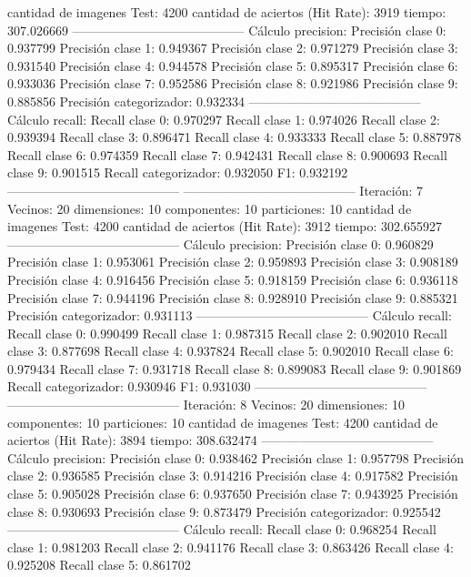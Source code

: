cantidad de imagenes Test: 4200
cantidad de aciertos (Hit Rate): 3919
tiempo: 307.026669
-----------------------------------------
Cálculo precision: 
Precisión clase 0: 0.937799
Precisión clase 1: 0.949367
Precisión clase 2: 0.971279
Precisión clase 3: 0.931540
Precisión clase 4: 0.944578
Precisión clase 5: 0.895317
Precisión clase 6: 0.933036
Precisión clase 7: 0.952586
Precisión clase 8: 0.921986
Precisión clase 9: 0.885856
Precisión categorizador: 0.932334
-----------------------------------------
Cálculo recall: 
Recall clase 0: 0.970297
Recall clase 1: 0.974026
Recall clase 2: 0.939394
Recall clase 3: 0.896471
Recall clase 4: 0.933333
Recall clase 5: 0.887978
Recall clase 6: 0.974359
Recall clase 7: 0.942431
Recall clase 8: 0.900693
Recall clase 9: 0.901515
Recall categorizador: 0.932050
F1: 0.932192
-----------------------------------------
-----------------------------------------
Iteración: 7
Vecinos: 20
dimensiones: 10
componentes: 10
particiones: 10
cantidad de imagenes Test: 4200
cantidad de aciertos (Hit Rate): 3912
tiempo: 302.655927
-----------------------------------------
Cálculo precision: 
Precisión clase 0: 0.960829
Precisión clase 1: 0.953061
Precisión clase 2: 0.959893
Precisión clase 3: 0.908189
Precisión clase 4: 0.916456
Precisión clase 5: 0.918159
Precisión clase 6: 0.936118
Precisión clase 7: 0.944196
Precisión clase 8: 0.928910
Precisión clase 9: 0.885321
Precisión categorizador: 0.931113
-----------------------------------------
Cálculo recall: 
Recall clase 0: 0.990499
Recall clase 1: 0.987315
Recall clase 2: 0.902010
Recall clase 3: 0.877698
Recall clase 4: 0.937824
Recall clase 5: 0.902010
Recall clase 6: 0.979434
Recall clase 7: 0.931718
Recall clase 8: 0.899083
Recall clase 9: 0.901869
Recall categorizador: 0.930946
F1: 0.931030
-----------------------------------------
-----------------------------------------
Iteración: 8
Vecinos: 20
dimensiones: 10
componentes: 10
particiones: 10
cantidad de imagenes Test: 4200
cantidad de aciertos (Hit Rate): 3894
tiempo: 308.632474
-----------------------------------------
Cálculo precision: 
Precisión clase 0: 0.938462
Precisión clase 1: 0.957798
Precisión clase 2: 0.936585
Precisión clase 3: 0.914216
Precisión clase 4: 0.917582
Precisión clase 5: 0.905028
Precisión clase 6: 0.937650
Precisión clase 7: 0.943925
Precisión clase 8: 0.930693
Precisión clase 9: 0.873479
Precisión categorizador: 0.925542
-----------------------------------------
Cálculo recall: 
Recall clase 0: 0.968254
Recall clase 1: 0.981203
Recall clase 2: 0.941176
Recall clase 3: 0.863426
Recall clase 4: 0.925208
Recall clase 5: 0.861702
